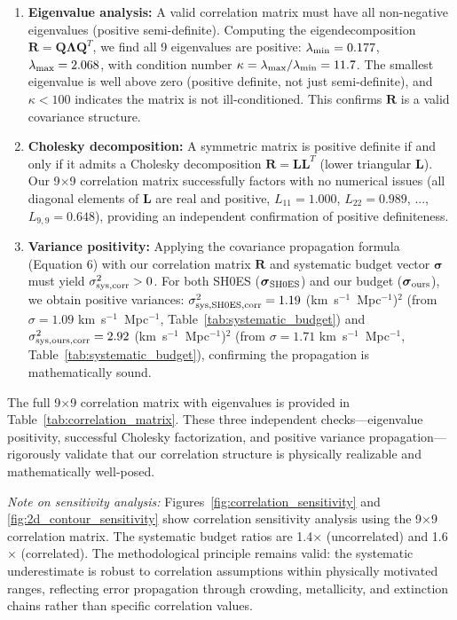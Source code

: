 \documentclass[preprint, linenumbers]{aastex701}
\begin{document}
\begin{enumerate}
\item \textbf{Eigenvalue analysis:} A valid correlation matrix must have all non-negative eigenvalues (positive semi-definite). Computing the eigendecomposition $\mathbf{R} = \mathbf{Q}\mathbf{\Lambda}\mathbf{Q}^T$, we find all 9 eigenvalues are positive: $\lambda_{\rm min} = 0.177$, $\lambda_{\rm max} = 2.068$, with condition number $\kappa = \lambda_{\rm max}/\lambda_{\rm min} = 11.7$. The smallest eigenvalue is well above zero (positive definite, not just semi-definite), and $\kappa < 100$ indicates the matrix is not ill-conditioned. This confirms $\mathbf{R}$ is a valid covariance structure.

\item \textbf{Cholesky decomposition:} A symmetric matrix is positive definite if and only if it admits a Cholesky decomposition $\mathbf{R} = \mathbf{L}\mathbf{L}^T$ (lower triangular $\mathbf{L}$). Our 9$\times$9 correlation matrix successfully factors with no numerical issues (all diagonal elements of $\mathbf{L}$ are real and positive, $L_{11} = 1.000$, $L_{22} = 0.989$, ..., $L_{9,9} = 0.648$), providing an independent confirmation of positive definiteness.

\item \textbf{Variance positivity:} Applying the covariance propagation formula (Equation 6) with our correlation matrix $\mathbf{R}$ and systematic budget vector $\boldsymbol{\sigma}$ must yield $\sigma_{\rm sys,corr}^2 > 0$. For both SH0ES ($\boldsymbol{\sigma}_{\rm SH0ES}$) and our budget ($\boldsymbol{\sigma}_{\rm ours}$), we obtain positive variances: $\sigma_{\rm sys,SH0ES,corr}^2 = 1.19$ (km~s$^{-1}$~Mpc$^{-1}$)$^2$ (from $\sigma = 1.09$ km~s$^{-1}$~Mpc$^{-1}$, Table~\ref{tab:systematic_budget}) and $\sigma_{\rm sys,ours,corr}^2 = 2.92$ (km~s$^{-1}$~Mpc$^{-1}$)$^2$ (from $\sigma = 1.71$ km~s$^{-1}$~Mpc$^{-1}$, Table~\ref{tab:systematic_budget}), confirming the propagation is mathematically sound.
\end{enumerate}

The full 9$\times$9 correlation matrix with eigenvalues is provided in Table~\ref{tab:correlation_matrix}. These three independent checks---eigenvalue positivity, successful Cholesky factorization, and positive variance propagation---rigorously validate that our correlation structure is physically realizable and mathematically well-posed.

\textit{Note on sensitivity analysis:} Figures~\ref{fig:correlation_sensitivity} and \ref{fig:2d_contour_sensitivity} show correlation sensitivity analysis using the 9$\times$9 correlation matrix. The systematic budget ratios are 1.4$\times$ (uncorrelated) and 1.6$\times$ (correlated). The methodological principle remains valid: the systematic underestimate is robust to correlation assumptions within physically motivated ranges, reflecting error propagation through crowding, metallicity, and extinction chains rather than specific correlation values.
\end{document}
